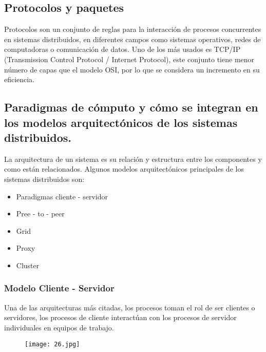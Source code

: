 \begin{center}
\subsection{Protocolos y paquetes}
\end{center}

Protocolos son un conjunto de reglas para la interacción de procesos concurrentes en sistemas distribuidos, en diferentes campos como sistemas operativos, redes de computadoras o comunicación de datos.
Uno de los más usados es TCP/IP (Transmission Control Protocol / Internet Protocol), este conjunto tiene menor número de capas que el modelo OSI, por lo que se considera un incremento en su eficiencia.


\begin{center}
\subsection{Paradigmas de cómputo y cómo se integran en los modelos arquitectónicos de los sistemas distribuidos.}
\end{center}

La arquitectura de un sistema es su relación y estructura entre los componentes y como están relacionados. Algunos modelos arquitectónicos principales de los sistemas distribuidos son:

\begin{itemize}
	\item Paradigmas cliente - servidor
	\item Pree - to - peer
	\item Grid
	\item Proxy
	\item Cluster
\end{itemize}

{\raggedright
\subsubsection{\textbf{Modelo Cliente - Servidor}}
}

Una de las arquitecturas más citadas, los procesos toman el rol de ser clientes o servidores, los procesos de cliente interactúan con los procesos de servidor individuales en equipos de trabajo.

\begin{figure}[h!]
		\centering
		{\texttt{[image: 26.jpg]}\par} \vspace{1cm}
\end{figure}


